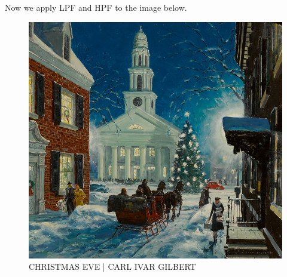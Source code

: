 \documentclass[hidelinks,12pt]{article}
\begin{document}
	 Now we apply LPF and HPF to the image below.
	
	\begin{figure}[hb!]
		\centering
		\includegraphics[scale=0.25]{figures/christmas_eve.jpg}
		\caption{CHRISTMAS EVE | CARL IVAR GILBERT}
	\end{figure}
	
\end{document}
